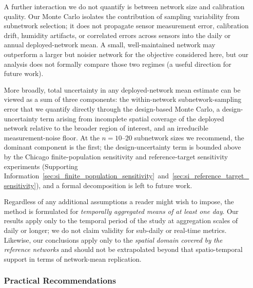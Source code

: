 \documentclass[12pt]{article}
\theoremstyle{remark}
\begin{document}
A further interaction we do not quantify is between network size and calibration quality. Our Monte Carlo isolates the contribution of sampling variability from subnetwork selection; it does not propagate sensor measurement error, calibration drift, humidity artifacts, or correlated errors across sensors into the daily or annual deployed-network mean. A small, well-maintained network may outperform a larger but noisier network for the objective considered here, but our analysis does not formally compare those two regimes (a useful direction for future work).

More broadly, total uncertainty in any deployed-network mean estimate can be viewed as a sum of three components: the within-network subnetwork-sampling error that we quantify directly through the design-based Monte Carlo, a design-uncertainty term arising from incomplete spatial coverage of the deployed network relative to the broader region of interest, and an irreducible measurement-noise floor. At the $n=10$--$20$ subnetwork sizes we recommend, the dominant component is the first; the design-uncertainty term is bounded above by the Chicago finite-population sensitivity and reference-target sensitivity experiments (Supporting Information~\ref{sec:si_finite_population_sensitivity}~and~\ref{sec:si_reference_target_sensitivity}), and a formal decomposition is left to future work.

Regardless of any additional assumptions a reader might wish to impose, the method is formulated for \emph{temporally aggregated means of at least one day}. Our results apply only to the temporal period of the study at aggregation scales of daily or longer; we do not claim validity for sub-daily or real-time metrics. Likewise, our conclusions apply only to the \emph{spatial domain covered by the reference networks} and should not be extrapolated beyond that spatio-temporal support in terms of network-mean replication.

\subsubsection{Practical Recommendations}\label{sec:practical_recommendations}
\end{document}

